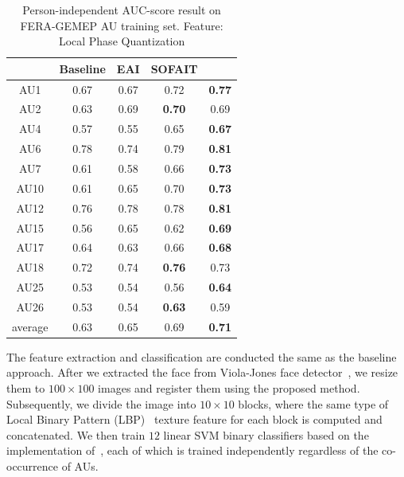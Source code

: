 \documentclass[10pt,journal]{IEEEtran}
\begin{document}
\begin{table}[htbp]
\caption{Person-independent AUC-score result on FERA-GEMEP AU training set. Feature: Local Phase Quantization}
\begin{center}
\label{table:fera_lpq}
\begin{tabular}{|c|cccc|}
\hline
& \pbox{10cm}{Baseline \\\cite{Valstar_FERA11}}	&\pbox{10cm}{EAI \\\cite{Yang_SMCB12}}	&\pbox{10cm}{SOFAIT \\\cite{Yang_FG13}}	&\pbox{10cm}{SOFIT}	\\ \hline
AU1		&0.67	&0.67	&0.72	&\textbf{0.77} \cellcolor[gray]{0.9}\cellcolor[gray]{0.9}	\\
AU2		&0.63	&0.69	&\textbf{0.70}\cellcolor[gray]{0.9}	&0.69	\\
AU4		&0.57	&0.55	&0.65	&\textbf{0.67}\cellcolor[gray]{0.9}	\\
AU6		&0.78	&0.74	&0.79	&\textbf{0.81}\cellcolor[gray]{0.9}	\\
AU7		&0.61	&0.58	&0.66	&\textbf{0.73}\cellcolor[gray]{0.9}	\\
AU10	&0.61	&0.65	&0.70	&\textbf{0.73}\cellcolor[gray]{0.9}	\\
AU12	&0.76	&0.78	&0.78	&\textbf{0.81}\cellcolor[gray]{0.9}	\\
AU15	&0.56	&0.65	&0.62	&\textbf{0.69}\cellcolor[gray]{0.9}	\\
AU17	&0.64	&0.63	&0.66	&\textbf{0.68}\cellcolor[gray]{0.9}	\\
AU18	&0.72	&0.74	&\textbf{0.76}\cellcolor[gray]{0.9}	&0.73	\\
AU25	&0.53	&0.54	&0.56	&\textbf{0.64}\cellcolor[gray]{0.9}	\\
AU26	&0.53	&0.54	&\textbf{0.63}\cellcolor[gray]{0.9}	&0.59	\\	\hline
average	&0.63	&0.65	&0.69	&\textbf{0.71}\cellcolor[gray]{0.9}	\\	\hline

\end{tabular}
\end{center}
\end{table}



The feature extraction and classification are conducted the same as the baseline approach. After we extracted the face from Viola-Jones face detector~\cite{Viola_IJCV04}, we resize them to $100\times100$ images and register them using the proposed method. Subsequently, we divide the image into $10\times10$ blocks, where the same type of Local Binary Pattern (LBP)~\cite{Ojala_PAMI02} texture feature for each block is computed and concatenated. We then train $12$ linear SVM binary classifiers based on the implementation of~\cite{SVMlib}, each of which is trained independently regardless of the co-occurrence of AUs.
\end{document}
